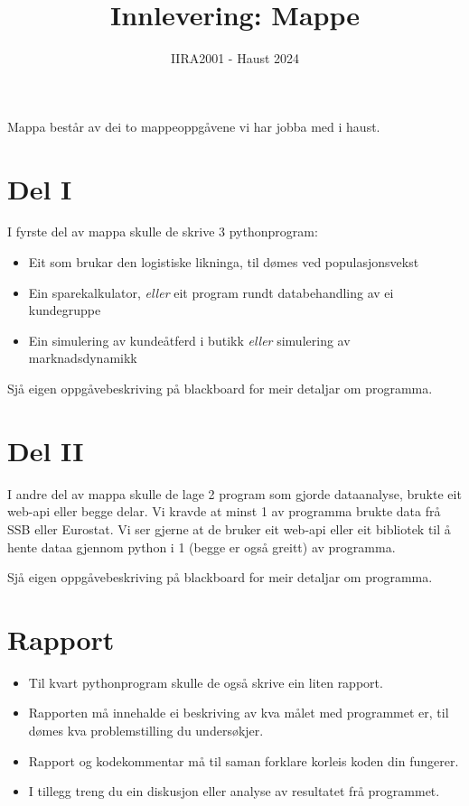 \documentclass[12pt, titlepage]{article}
\begin{document}
\title{Innlevering: Mappe}
\author{IIRA2001 - Haust 2024}
\date{}
\maketitle

Mappa består av dei to mappeoppgåvene vi har jobba med i haust.

\section*{Del I}

I fyrste del av mappa skulle de skrive 3 pythonprogram:
\begin{itemize}
   \item {Eit som brukar den logistiske likninga, til dømes ved populasjonsvekst}
   \item {Ein sparekalkulator, \textit{eller} eit program rundt databehandling av ei kundegruppe}
   \item {Ein simulering av kundeåtferd i butikk \textit{eller} simulering av marknadsdynamikk}
\end{itemize}

Sjå eigen oppgåvebeskriving på blackboard for meir detaljar om programma.

\section*{Del II}

I andre del av mappa skulle de lage 2 program som gjorde dataanalyse, brukte eit web-api eller begge delar.
Vi kravde at minst 1 av programma brukte data frå SSB eller Eurostat. Vi ser gjerne at de bruker eit web-api eller eit bibliotek til å hente dataa gjennom python i 1 (begge er også greitt) av programma.

Sjå eigen oppgåvebeskriving på blackboard for meir detaljar om programma.

\section*{Rapport}

\begin{itemize}
   \item{Til kvart pythonprogram skulle de også skrive ein liten rapport.}
   \item {Rapporten må innehalde ei beskriving av kva målet med programmet er, til dømes kva problemstilling du undersøkjer.}
   \item {Rapport og kodekommentar må til saman forklare korleis koden din fungerer.}
   \item {I tillegg treng du ein diskusjon eller analyse av resultatet frå programmet.}
\end{itemize}
\end{document}
